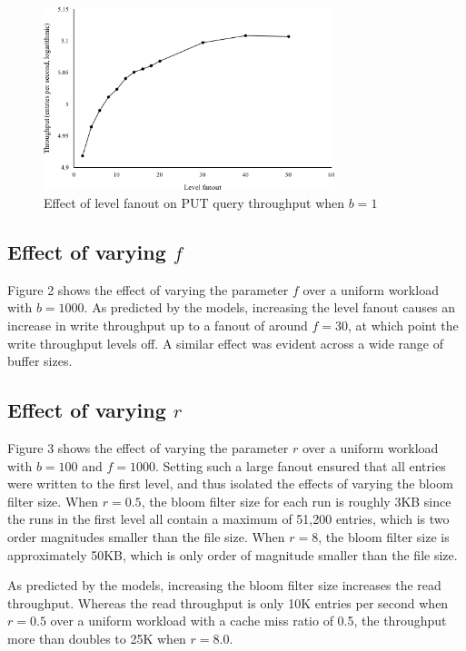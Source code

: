 \documentclass{acm}
\begin{document}
\begin{figure}
\centering
\includegraphics[width=3.33in]{fanout}
\caption{Effect of level fanout on PUT query throughput when $b=1$}
\end{figure}

\subsection{Effect of varying $f$}

Figure 2 shows the effect of varying the parameter $f$ over a uniform workload with $b = 1000$. As predicted by the models, increasing the level fanout causes an increase in write throughput up to a fanout of around $f=30$, at which point the write throughput levels off. A similar effect was evident across a wide range of buffer sizes.

\subsection{Effect of varying $r$}

Figure 3 shows the effect of varying the parameter $r$ over a uniform workload with $b = 100$ and $f = 1000$. Setting such a large fanout ensured that all entries were written to the first level, and thus isolated the effects of varying the bloom filter size. When $r=0.5$, the bloom filter size for each run is roughly 3KB since the runs in the first level all contain a maximum of 51,200 entries, which is two order magnitudes smaller than the file size. When $r=8$, the bloom filter size is approximately 50KB, which is only order of magnitude smaller than the file size.

As predicted by the models, increasing the bloom filter size increases the read throughput. Whereas the read throughput is only 10K entries per second when $r=0.5$ over a uniform workload with a cache miss ratio of 0.5, the throughput more than doubles to 25K when $r=8.0$.
\end{document}
